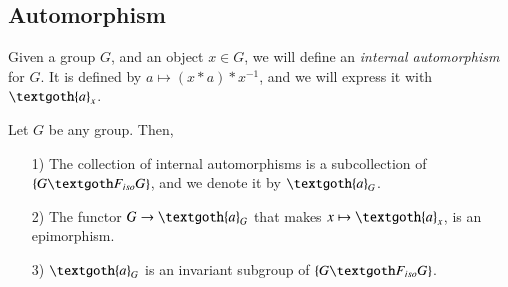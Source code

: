 \documentclass [12pt]{book}
\begin{document}
	\subsection{Automorphism}

Given a group $G$, and an object $x\in G$, we will define an \textit{internal automorphism} for $G$. It is defined by $a\mapsto (x*a)*x^{-1}$, and we will express it with $\textgoth{a}_{x}$.

\begin{theorem}Let $G$ be any group. Then,

\begin{itemize}\item[1)]The collection of internal automorphisms is a subcollection of $\{G\textgoth F_{iso}G\}$, and we denote it by $\textgoth{a}_{G}$. \item[2)] The functor $G\rightarrow\textgoth{a}_{G}$ that makes $x\mapsto\textgoth{a}_{x}$, is an epimorphism.\item[3)]$\textgoth{a}_{G}$ is an invariant subgroup of $\{G\textgoth F_{iso}G\}$.\end{itemize}
\end{theorem}
\end{document}
